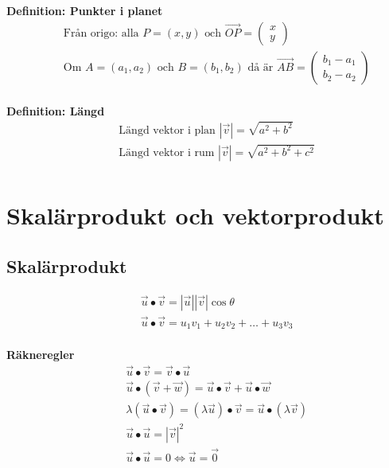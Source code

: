 \textbf{Definition: Punkter i planet}
\begin{align*}
  &\quad  \text{Från origo: alla } P=(x,y) \text{ och }
  \overrightarrow{OP} = \begin{pmatrix}  x \\  y   \end{pmatrix} \\
  &\quad  \text{Om } A=(a_1,a_2) \text{ och } B=(b_1,b_2) \text{ då är }
  \overrightarrow{AB} =  \begin{pmatrix}  b_1-a_1 \\  b_2-a_2   \end{pmatrix} \\
\end{align*}


\textbf{Definition: Längd}
\begin{align*}
  &\quad  \text{Längd vektor i plan } |\vec{v}| = \sqrt{a^2+b^2} \\
  &\quad  \text{Längd vektor i rum } |\vec{v}| = \sqrt{a^2+b^2+c^2} \\
\end{align*}


\newpage

\section{Skalärprodukt och vektorprodukt}
\subsection{Skalärprodukt}
\begin{align*}
  &\quad  \vec{u}\bullet\vec{v} = |\vec{u}||\vec{v}|\cos{\theta} \\
  &\quad  \vec{u}\bullet\vec{v} = u_1v_1+u_2v_2+ \ldots +u_3v_3 \\
\end{align*}

\textbf{Räkneregler}
\begin{align*}
  &\quad  \vec{u}\bullet\vec{v} = \vec{v}\bullet\vec{u} \\
  &\quad  \vec{u}\bullet(\vec{v}+\vec{w}) = \vec{u}\bullet\vec{v} + \vec{u}\bullet\vec{w} \\
  &\quad  \lambda(\vec{u}\bullet\vec{v}) = (\lambda\vec{u})\bullet\vec{v} =
  \vec{u}\bullet(\lambda\vec{v}) \\
  &\quad  \vec{u}\bullet\vec{u} = |\vec{v}|^2 \\
  &\quad  \vec{u}\bullet\vec{u} = 0 \Leftrightarrow \vec{u} = \vec{0} \\
\end{align*}

